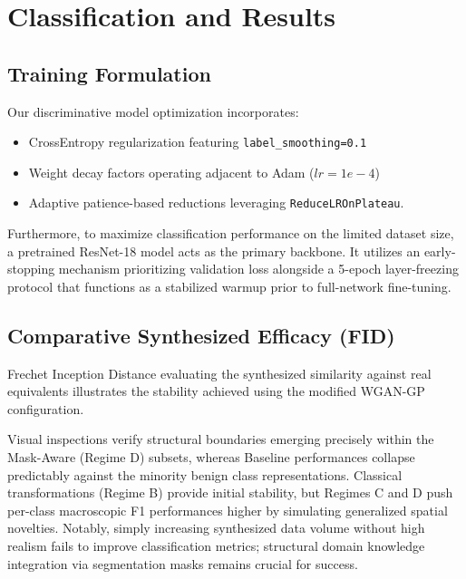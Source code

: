 \documentclass[12pt,a4paper]{article}
\begin{document}
\section{Classification and Results}

\subsection{Training Formulation}
Our discriminative model optimization incorporates:
\begin{itemize}
    \item CrossEntropy regularization featuring \texttt{label\_smoothing=0.1}
    \item Weight decay factors operating adjacent to Adam ($lr=1e-4$)
    \item Adaptive patience-based reductions leveraging \texttt{ReduceLROnPlateau}.
\end{itemize}

Furthermore, to maximize classification performance on the limited dataset size, a pretrained ResNet-18 model acts as the primary backbone. It utilizes an early-stopping mechanism prioritizing validation loss alongside a 5-epoch layer-freezing protocol that functions as a stabilized warmup prior to full-network fine-tuning.

\subsection{Comparative Synthesized Efficacy (FID)}
Frechet Inception Distance evaluating the synthesized similarity against real equivalents illustrates the stability achieved using the modified WGAN-GP configuration.

\begin{result}
Visual inspections verify structural boundaries emerging precisely within the Mask-Aware (Regime D) subsets, whereas Baseline performances collapse predictably against the minority benign class representations. Classical transformations (Regime B) provide initial stability, but Regimes C and D push per-class macroscopic F1 performances higher by simulating generalized spatial novelties. Notably, simply increasing synthesized data volume without high realism fails to improve classification metrics; structural domain knowledge integration via segmentation masks remains crucial for success.
\end{result}
\end{document}
